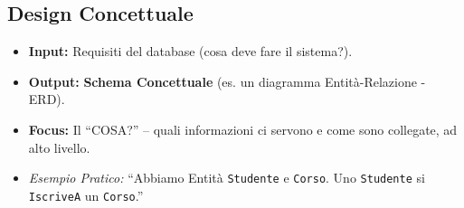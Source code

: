 \subsection{Design Concettuale}
\begin{itemize}
	\item \textbf{Input:} Requisiti del database (cosa deve fare il sistema?).
	\item \textbf{Output:} \textbf{Schema Concettuale} (es. un diagramma Entità-Relazione - ERD).
	\item \textbf{Focus:} Il ``COSA?'' – quali informazioni ci servono e come sono collegate, ad alto livello.
	\item \textit{Esempio Pratico:} ``Abbiamo Entità \texttt{Studente} e \texttt{Corso}. Uno \texttt{Studente} si \texttt{IscriveA} un \texttt{Corso}.''
\end{itemize}

	
